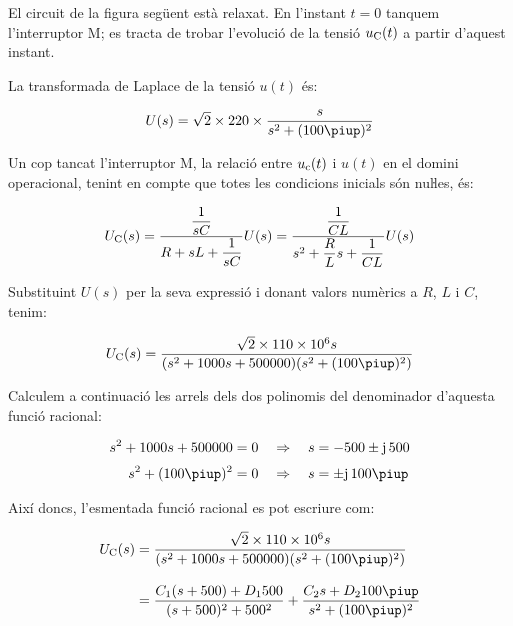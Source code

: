 \begin{exemple}
\label{ex:laplace}
    El circuit de la figura següent està relaxat. En l'instant $t=0$
    tanquem l'interruptor M; es tracta de trobar l'evolució de la tensió
    $u_\mathrm{C}(t)$ a partir d'aquest instant.

    \begin{center}
        
    \end{center}

    La transformada de Laplace de la tensió $u(t)$ és:

    \[
        U(s) = \sqrt{2}\times 220\times \frac{s}{s^2 + (100\piup)^2}
    \]

    Un cop tancat l'interruptor M, la relació entre $u_\mathrm{c}(t)$ i
    $u(t)$ en el domini operacional, tenint en compte que totes les
    condicions inicials són nuŀles, és:

    \[
        U_\mathrm{C}(s) = \frac{\dfrac{1}{sC}}{R+ sL +\dfrac{1}{sC}} U(s)=
        \frac{\dfrac{1}{CL}}{s^2 + \dfrac{R}{L}s +\dfrac{1}{CL}} U(s)
    \]

    Substituint $U(s)$ per la seva expressió i donant valors numèrics a
    $R$, $L$ i $C$, tenim:

    \[
        U\ped{C}(s) = \frac{\sqrt{2}\times 110\times 10^6 s}{(s^2 + 1000 s + 500000)(s^2 + (100\piup)^2)}
    \]

    Calculem a continuació les arrels dels dos polinomis  del
    denominador d'aquesta funció racional:

    \begin{align*}
        s^2 + 1000 s + 500000 &= 0 \quad\Rightarrow\quad s = -500
        \pm\ju\,500 \\[0.5ex]
        s^2 + (100\piup)^2 &= 0 \quad\Rightarrow\quad s = \pm\ju\,100\piup
    \end{align*}

    Així doncs, l'esmentada funció racional es pot escriure com:

    \[\begin{split}
    U\ped{C}(s) &= \frac{\sqrt{2}\times 110\times 10^6 s}{(s^2 + 1000 s +
    500000)(s^2 + (100\piup)^2)}   \\[2ex] &= \frac{C_1 (s+500) + D_1
    500}{(s+500)^2+500^2} + \frac{C_2 s + D_2 100 \piup}{s^2 +(100\piup)^2}
    \end{split}\]


\end{exemple}
